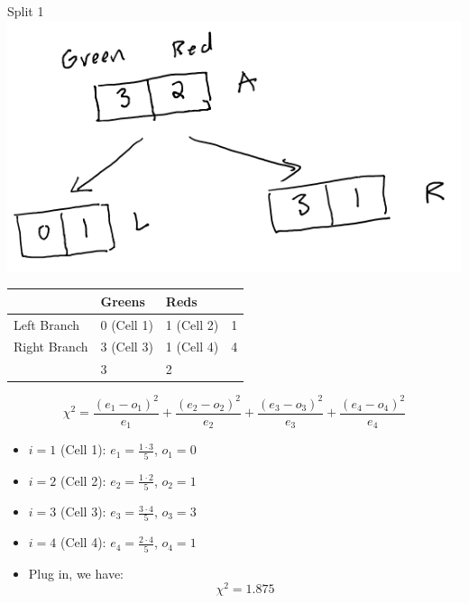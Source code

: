 \documentclass[
  ignorenonframetext,
]{beamer}
\begin{document}
\begin{frame}{Split 1}
\protect\hypertarget{split-1}{}
\includegraphics{images/im1.png}

\begin{longtable}[]{@{}llll@{}}
\toprule
& Greens & Reds & \\
\midrule
\endhead
Left Branch & 0 (Cell 1) & 1 (Cell 2) & 1 \\
Right Branch & 3 (Cell 3) & 1 (Cell 4) & 4 \\
& 3 & 2 & \\
\bottomrule
\end{longtable}

\[\chi^2 = \frac{(e_1-o_1)^2}{e_1}+\frac{(e_2-o_2)^2}{e_2}+\frac{(e_3-o_3)^2}{e_3}+\frac{(e_4-o_4)^2}{e_4}\]

\begin{itemize}
\item
  \(i=1\) (Cell 1): \(e_1 = \frac{1\cdot 3}{5}\), \(o_1 = 0\)
\item
  \(i=2\) (Cell 2): \(e_2 = \frac{1\cdot 2}{5}\), \(o_2 = 1\)
\item
  \(i=3\) (Cell 3): \(e_3 = \frac{3\cdot 4}{5}\), \(o_3 = 3\)
\item
  \(i=4\) (Cell 4): \(e_4 = \frac{2\cdot 4}{5}\), \(o_4 = 1\)
\item
  Plug in, we have: \[\chi^2 = 1.875\]
\end{itemize}
\end{frame}
\end{document}
